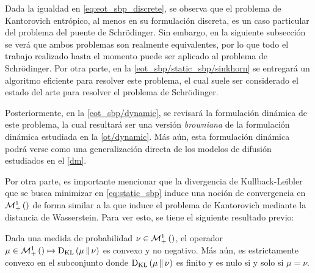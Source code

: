 Dada la igualdad en \eqref{eq:eot_sbp_discrete}, se observa que el problema de Kantorovich entrópico, al menos en su formulación discreta, es un caso particular del problema del puente de Schrödinger. Sin embargo, en la siguiente subsección se verá que ambos problemas son realmente equivalentes, por lo que todo el trabajo realizado hasta el momento puede ser aplicado al problema de Schrödinger. Por otra parte, en la \autoref{eot_sbp/static_sbp/sinkhorn} se entregará un algoritmo eficiente para resolver este problema, el cual suele ser considerado el estado del arte para resolver el problema de Schrödinger.

Posteriormente, en la \autoref{eot_sbp/dynamic}, se revisará la formulación dinámica de este problema, la cual resultará ser una versión \textit{browniana} de la formulación dinámica estudiada en la \autoref{ot/dynamic}. Más aún, esta formulación dinámica podrá verse como una generalización directa de los modelos de difusión estudiados en el \autoref{dm}.

Por otra parte, es importante mencionar que la divergencia de Kullback-Leibler que se busca minimizar en \eqref{eq:static_sbp} induce una noción de convergencia en $\mathcal{M}_+^1\left(\right)$ de forma similar a la que induce el problema de Kantorovich mediante la distancia de Wasserstein. Para ver esto, se tiene el siguiente resultado previo:

\begin{prop}
	Dada una medida de probabilidad $\nu\in\mathcal{M}_+^1\left(\right)$, el operador $\mu\in\mathcal{M}_+^1\left(\right) \mapsto \operatorname{D_{KL}}\left(\mu\,\|\,\nu\right)$ es convexo y no negativo. Más aún, es estrictamente convexo en el subconjunto donde $\operatorname{D_{KL}}\left(\mu\,\|\,\nu\right)$ es finito y es nulo si y solo si $\mu=\nu$.
\end{prop}

